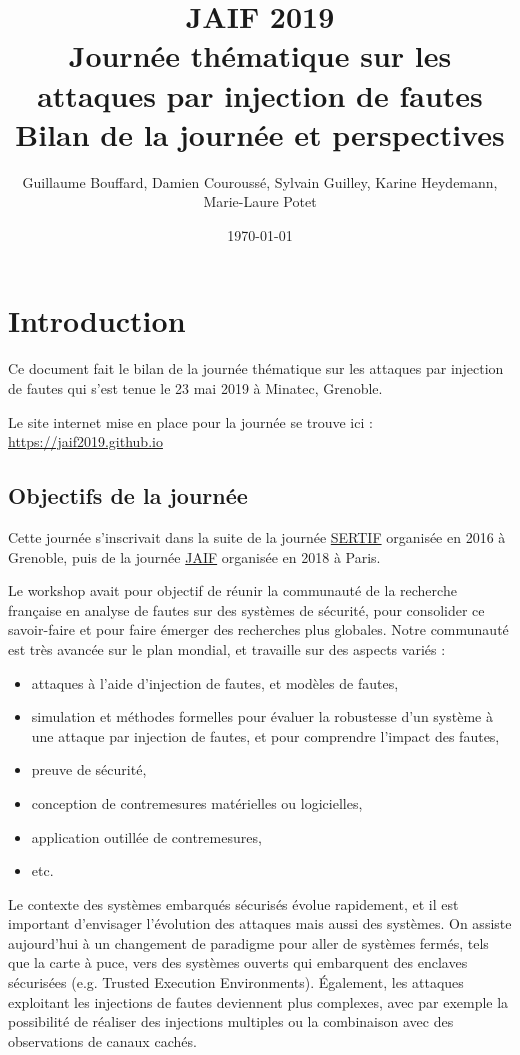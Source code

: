 \documentclass[a4paper,11pt]{article}
\author{Guillaume Bouffard,  Damien Couroussé, Sylvain Guilley,  Karine Heydemann, Marie-Laure Potet}
\date{\today}
\title{JAIF 2019 \\ Journée thématique sur les attaques par injection de fautes\\\medskip
\large Bilan de la journée et perspectives}
\begin{document}
\maketitle
\tableofcontents


\section{Introduction}
\label{sec:orgd0be982}

Ce document fait le bilan de la journée thématique sur les attaques
par injection de fautes qui s'est tenue le 23 mai 2019 à Minatec, Grenoble.

Le site internet mise en place pour la journée se trouve ici :
\url{https://jaif2019.github.io}

\subsection{Objectifs de la journée}
\label{sec:org3a761c9}

Cette journée s’inscrivait dans la suite de la journée \href{https://lazart.gricad-pages.univ-grenoble-alpes.fr/sertif/pages/workshop.html}{SERTIF} organisée
en 2016 à Grenoble,
puis de la journée \href{https://wp-systeme.lip6.fr/jaif}{JAIF} organisée en 2018 à Paris.

Le workshop avait pour objectif de réunir la communauté de la
recherche française en analyse de fautes sur des systèmes de sécurité,
pour consolider ce savoir-faire et pour faire émerger des recherches
plus globales.  Notre communauté est très avancée sur le plan mondial,
et travaille sur des aspects variés :

\begin{itemize}
\item attaques à l'aide d'injection de fautes, et modèles de fautes,
\item simulation et méthodes formelles pour évaluer la robustesse d'un
système à une attaque par injection de fautes, et pour comprendre
l’impact des fautes,
\item preuve de sécurité,
\item conception de contremesures matérielles ou logicielles,
\item application outillée de contremesures,
\item etc.
\end{itemize}

Le contexte des systèmes embarqués sécurisés évolue
rapidement, et il est important d’envisager l’évolution des
attaques mais aussi des systèmes.
On assiste aujourd’hui à un changement de paradigme pour aller de
systèmes fermés, tels que la carte à puce, vers des systèmes ouverts qui
embarquent des enclaves sécurisées (e.g. Trusted Execution
Environments).  Également, les attaques exploitant les injections de
fautes deviennent plus complexes, avec par exemple la possibilité de
réaliser des injections multiples ou la combinaison avec des
observations de canaux cachés.
\end{document}
